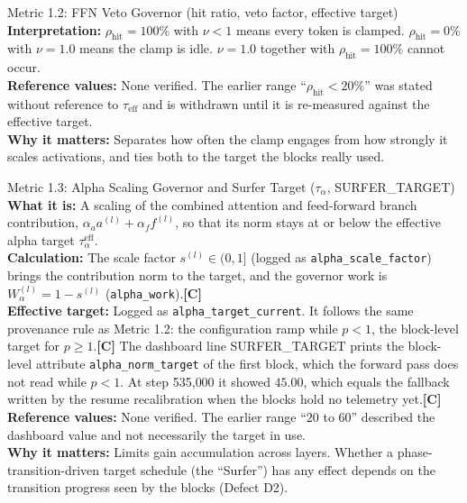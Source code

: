 \documentclass[11pt,a4paper]{article}
\newcommand{\sC}{\textbf{[C]}}
\begin{document}
\begin{metricbox}{Metric 1.2: FFN Veto Governor (hit ratio, veto factor, effective target)}
\textbf{Interpretation:} $\rho_{\text{hit}} = 100\%$ with $\nu < 1$ means every token is clamped. $\rho_{\text{hit}} = 0\%$ with $\nu = 1.0$ means the clamp is idle. $\nu = 1.0$ together with $\rho_{\text{hit}} = 100\%$ cannot occur.\\
\textbf{Reference values:} None verified. The earlier range ``$\rho_{\text{hit}} < 20\%$'' was stated without reference to $\tau_{\text{eff}}$ and is withdrawn until it is re-measured against the effective target.\\
\textbf{Why it matters:} Separates how often the clamp engages from how strongly it scales activations, and ties both to the target the blocks really used.
\end{metricbox}

\begin{metricbox}{Metric 1.3: Alpha Scaling Governor and Surfer Target ($\tau_\alpha$, SURFER\_TARGET)}
\textbf{What it is:} A scaling of the combined attention and feed-forward branch contribution, $\alpha_a a^{(l)} + \alpha_f f^{(l)}$, so that its norm stays at or below the effective alpha target $\tau_\alpha^{\text{eff}}$.\\
\textbf{Calculation:} The scale factor $s^{(l)} \in (0,1]$ (logged as \texttt{alpha\_scale\_factor}) brings the contribution norm to the target, and the governor work is $W_\alpha^{(l)} = 1 - s^{(l)}$ (\texttt{alpha\_work}).\sC{}\\
\textbf{Effective target:} Logged as \texttt{alpha\_target\_current}. It follows the same provenance rule as Metric 1.2: the configuration ramp while $p < 1$, the block-level target for $p \ge 1$.\sC{} The dashboard line SURFER\_TARGET prints the block-level attribute \texttt{alpha\_norm\_target} of the first block, which the forward pass does not read while $p < 1$. At step 535{,}000 it showed $45.00$, which equals the fallback written by the resume recalibration when the blocks hold no telemetry yet.\sC{}\\
\textbf{Reference values:} None verified. The earlier range ``$20$ to $60$'' described the dashboard value and not necessarily the target in use.\\
\textbf{Why it matters:} Limits gain accumulation across layers. Whether a phase-transition-driven target schedule (the ``Surfer'') has any effect depends on the transition progress seen by the blocks (Defect D2).
\end{metricbox}
\end{document}
